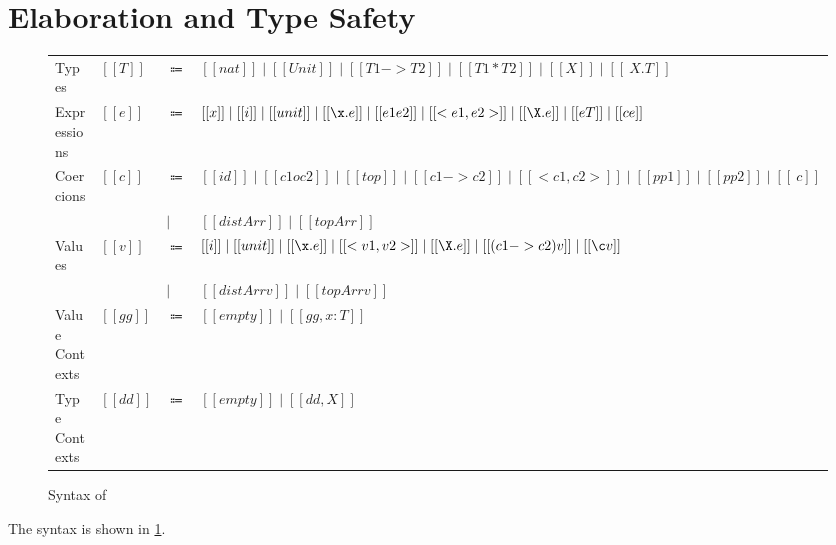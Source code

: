 
\section{Elaboration and Type Safety}
\label{sec:elaboration:fi}



\begin{figure}[t]
  \centering
\begin{tabular}{llll} \toprule
  Types & $[[T]]$ & $\Coloneqq$ & $[[nat]] \mid [[Unit]] \mid [[T1 -> T2]]  \mid [[T1 * T2]] \mid [[X]] \mid [[\ X . T]]$\\
  Expressions & $[[e]]$ & $\Coloneqq$ & $[[x]] \mid [[i]] \mid [[unit]] \mid [[\x . e]] \mid [[e1 e2]] \mid [[< e1 , e2>]] \mid [[\X . e]] \mid [[ e T ]] \mid [[c e]]$ \\
  Coercions & $[[c]]$ & $\Coloneqq$ & $[[id]] \mid [[c1 o c2]] \mid [[top]] \mid [[c1 -> c2]] \mid [[< c1 , c2 >]] \mid [[pp1]] \mid [[pp2]] \mid [[\ c]]$ \\
  & & $\mid$ & $ [[distArr]] \mid [[topArr]] $ \\
  Values & $[[v]]$ & $\Coloneqq$ & $[[i]] \mid [[unit]] \mid [[\x . e]] \mid [[< v1 , v2>]] \mid [[\X . e]] \mid [[ (c1 -> c2) v ]] \mid [[\c v]]  $ \\
  & & $\mid$ & $ [[distArr v]] \mid [[topArr v]] $ \\
  Value Contexts & $[[gg]]$ & $\Coloneqq$ &  $[[empty]] \mid [[gg , x : T]] $ \\
  Type Contexts & $[[dd]]$ & $\Coloneqq$ &  $[[empty]] \mid [[dd , X ]] $ \\ \bottomrule
\end{tabular}
\caption{Syntax of \tnamee}
\label{fig:syntax:fco}
\end{figure}


The syntax is shown in \cref{fig:syntax:fco}.






